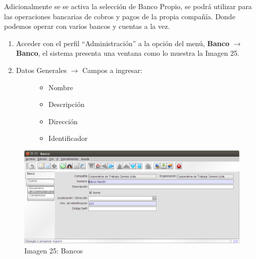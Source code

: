 \documentclass[letterpaper,10pt,spanish]{sphinxmanual}
\begin{document}
Adicionalmente se se activa la selección de Banco Propio, se podrá utilizar para las operaciones bancarias de cobros y pagos de la propia compañía. Donde podemos operar con varios bancos y cuentas a la vez.
\begin{enumerate}
\item {} 
Acceder con el perfil ``Administración'' a la opción del menú, \textbf{Banco} \(\rightarrow\)  \textbf{Banco}, el sistema presenta una ventana como lo muestra la Imagen 25.

\item {} \begin{description}
\item[{Datos Generales \(\rightarrow\) Campos a ingresar:}] \leavevmode\begin{itemize}
\item {} 
Nombre

\item {} 
Descripción

\item {} 
Dirección

\item {} 
Identificador

\end{itemize}

\end{description}

\end{enumerate}
\begin{figure}[htbp]
\centering
\capstart

\includegraphics{ly_bancos_25.png}
\caption{Imagen 25: Bancos}\end{figure}
\end{document}

